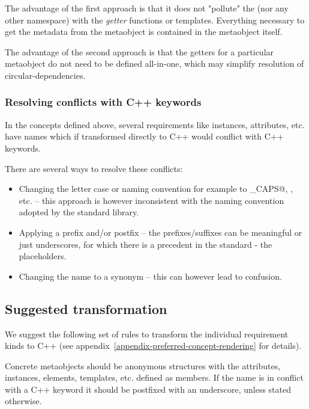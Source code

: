 The advantage of the first approach is that it does not "pollute"
the \verb@std@ (nor any other namespace) with the \emph{getter} functions or templates.
Everything necessary to get the metadata from the metaobject is contained
in the metaobject itself.

The advantage of the second approach is that the getters for a particular
metaobject do not need to be defined all-in-one, which may simplify
resolution of circular-dependencies.

\subsubsection{Resolving conflicts with C++ keywords}
\label{section-resolving-keyword-conflicts}

In the concepts defined above, several requirements like instances, attributes, etc.
have names which if transformed directly to C++ would conflict with C++ keywords.

There are several ways to resolve these conflicts:
\begin{itemize}
\item Changing the letter case or naming convention for example to \verb@ALL_CAPS@, \verb@CamelCase@, etc. --
this approach is however inconsistent with the naming convention adopted by the standard
library.

\item Applying a prefix and/or postfix -- the prefixes/suffixes can be meaningful or just underscores,
for which there is a precedent in the standard - the placeholders.

\item Changing the name to a synonym -- this can however lead to confusion.

\end{itemize}

\subsection{Suggested transformation}

We suggest the following set of rules to transform the individual requirement
kinds to C++ (see appendix~\ref{appendix-preferred-concept-rendering} for
details). 

Concrete metaobjects should be anonymous structures with the attributes,
instances, elements, templates, etc. defined as members.
If the name is in conflict with a C++ keyword it should be postfixed
with an underscore, unless stated otherwise.

